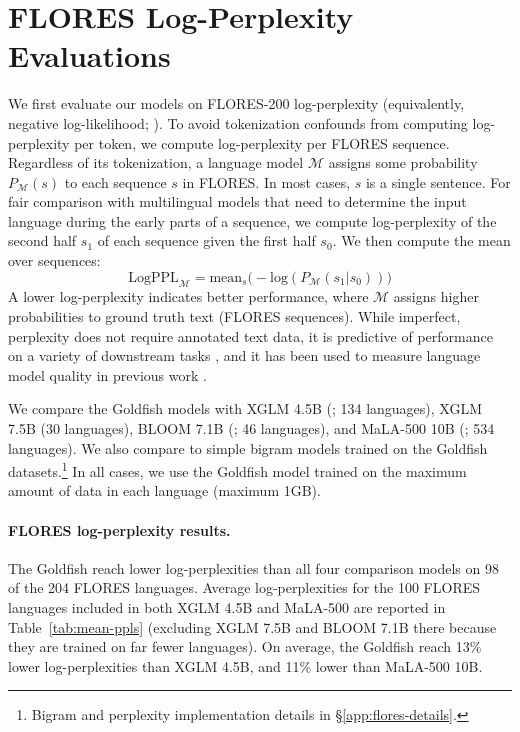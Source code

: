 \documentclass[11pt]{article}
\begin{document}
\section{FLORES Log-Perplexity Evaluations}
\label{sec:flores-ppls}
We first evaluate our models on FLORES-200 log-perplexity \citep{costa2022no} (equivalently, negative log-likelihood; \citealp{lin-2024-mala500}).
To avoid tokenization confounds from computing log-perplexity per token, we compute log-perplexity per FLORES sequence.
Regardless of its tokenization, a language model $\mathcal{M}$ assigns some probability $P_{\mathcal{M}}(s)$ to each sequence $s$ in FLORES.
In most cases, $s$ is a single sentence.
For fair comparison with multilingual models that need to determine the input language during the early parts of a sequence, we compute log-perplexity of the second half $s_1$ of each sequence given the first half $s_0$.
We then compute the mean over sequences:
\setlength{\abovedisplayskip}{0.2cm}
\setlength{\belowdisplayskip}{0.2cm}
\begin{equation}
\label{eq:ppl}
\textrm{LogPPL}_{\mathcal{M}} = \textrm{mean}_{s} \Big( - \textrm{log}( P_{\mathcal{M}}(s_1 | s_0)) \Big)
\end{equation}
A lower log-perplexity indicates better performance, where $\mathcal{M}$ assigns higher probabilities to ground truth text (FLORES sequences).
While imperfect, perplexity does not require annotated text data, it is predictive of performance on a variety of downstream tasks 
\citep{xia-etal-2023-training}, and it has been used to measure language model quality in previous work \citep{kaplan-etal-2020-scaling,hoffmann-etal-2022-training,lin-2024-mala500}.

We compare the Goldfish models with XGLM 4.5B (\citealp{lin2022xglm}; 134 languages), XGLM 7.5B (30 languages), BLOOM 7.1B (\citealp{bigscience-bloom}; 46 languages), and MaLA-500 10B (\citealp{lin-2024-mala500}; 534 languages).
We also compare to simple bigram models trained on the Goldfish datasets.\footnote{Bigram and perplexity implementation details in \S\ref{app:flores-details}.}
In all cases, we use the Goldfish model trained on the maximum amount of data in each language (maximum 1GB).

\paragraph{FLORES log-perplexity results.}
The Goldfish reach lower log-perplexities than all four comparison models on 98 of the 204 FLORES languages.
Average log-perplexities for the 100 FLORES languages included in both XGLM 4.5B and MaLA-500 are reported in Table~\ref{tab:mean-ppls} (excluding XGLM 7.5B and BLOOM 7.1B there because they are trained on far fewer languages).
On average, the Goldfish reach 13\% lower log-perplexities than XGLM 4.5B, and 11\% lower than MaLA-500 10B.
\end{document}
